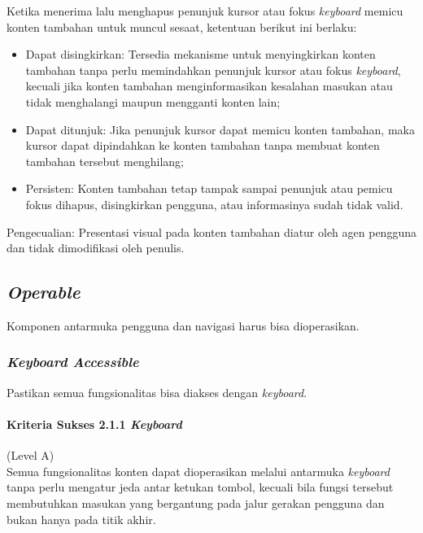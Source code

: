 Ketika menerima lalu menghapus penunjuk kursor atau fokus \textit{keyboard} memicu konten tambahan untuk muncul sesaat, ketentuan berikut ini berlaku:

\begin{itemize}
	\item Dapat disingkirkan: Tersedia mekanisme untuk menyingkirkan konten tambahan tanpa perlu memindahkan penunjuk kursor atau fokus \textit{keyboard}, kecuali jika konten tambahan menginformasikan kesalahan masukan atau tidak menghalangi maupun mengganti konten lain;
	\item Dapat ditunjuk: Jika penunjuk kursor dapat memicu konten tambahan, maka kursor dapat dipindahkan ke konten tambahan tanpa membuat konten tambahan tersebut menghilang;
	\item Persisten: Konten tambahan tetap tampak sampai penunjuk atau pemicu fokus dihapus, disingkirkan pengguna, atau informasinya sudah tidak valid.
\end{itemize}

Pengecualian: Presentasi visual pada konten tambahan diatur oleh agen pengguna dan tidak dimodifikasi oleh penulis.



\subsection{\textit{Operable}}
\label{sec:operable}
Komponen antarmuka pengguna dan navigasi harus bisa dioperasikan.

\subsubsection{\textit{Keyboard Accessible}}
\label{sec:keyboard_accessible}
Pastikan semua fungsionalitas bisa diakses dengan \textit{keyboard}.

\paragraph{Kriteria Sukses 2.1.1 \textit{Keyboard}}
\label{sec:kriteria_sukses_2.1.1}
(Level A)\\

Semua fungsionalitas konten dapat dioperasikan melalui antarmuka \textit{keyboard} tanpa perlu mengatur jeda antar ketukan tombol, kecuali bila fungsi tersebut membutuhkan masukan yang bergantung pada jalur gerakan pengguna dan bukan hanya pada titik akhir.

